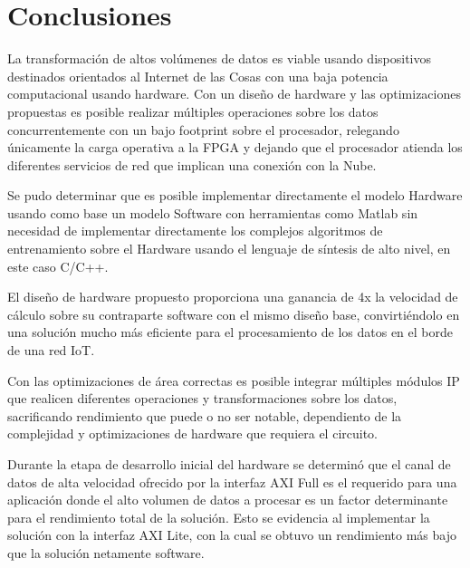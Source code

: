 
\chapter{Conclusiones} %
\label{Chapter14}


La transformación de altos volúmenes de datos es viable usando dispositivos destinados orientados al Internet de las Cosas con una baja potencia computacional usando hardware. Con un diseño de hardware y las optimizaciones propuestas es posible realizar múltiples operaciones sobre los datos concurrentemente con un bajo footprint sobre el procesador, relegando únicamente la carga operativa a la FPGA y dejando que el procesador atienda los diferentes servicios de red que implican una conexión con la Nube.

Se pudo determinar que es posible implementar directamente el modelo Hardware usando como base un modelo Software con herramientas como Matlab sin necesidad de implementar directamente los complejos algoritmos de entrenamiento sobre el Hardware usando el lenguaje de síntesis de alto nivel, en este caso C/C++.%

El diseño de hardware propuesto proporciona una ganancia de 4x la velocidad de cálculo sobre su contraparte software con el mismo diseño base, convirtiéndolo en una solución mucho más eficiente para el procesamiento de los datos en el borde de una red IoT.

Con las optimizaciones de área correctas es posible integrar múltiples módulos IP que realicen diferentes operaciones y transformaciones sobre los datos, sacrificando rendimiento que puede o no ser notable, dependiento de la complejidad y optimizaciones de hardware que requiera el circuito.

Durante la etapa de desarrollo inicial del hardware se determinó que el canal de datos de alta velocidad ofrecido por la interfaz AXI Full es el requerido para una aplicación donde el alto volumen de datos a procesar es un factor determinante para el rendimiento total de la solución. Esto se evidencia al implementar la solución con la interfaz AXI Lite, con la cual se obtuvo un rendimiento más bajo que la solución netamente software.

